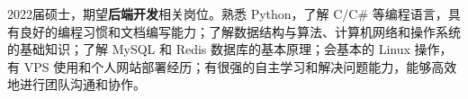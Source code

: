 {\onehalfspacing\hspace{2em}%
2022届硕士，期望\textbf{后端开发}相关岗位。熟悉 Python，了解 C/C\# 等编程语言，具有良好的编程习惯和文档编写能力；了解数据结构与算法、计算机网络和操作系统的基础知识；了解 MySQL 和 Redis 数据库的基本原理；会基本的 Linux 操作，有 VPS 使用和个人网站部署经历；有很强的自主学习和解决问题能力，能够高效地进行团队沟通和协作。
\par}